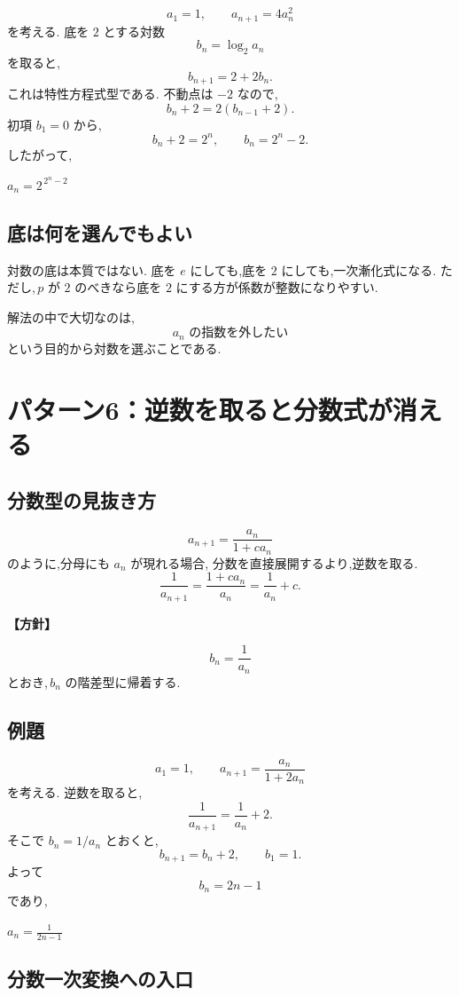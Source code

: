 \[
  a_1=1,\qquad a_{n+1}=4a_n^2
\]
を考える.
底を $2$ とする対数
\[
  b_n=\log_2a_n
\]
を取ると,
\[
  b_{n+1}=2+2b_n.
\]
これは特性方程式型である.
不動点は $-2$ なので,
\[
  b_n+2=2(b_{n-1}+2).
\]
初項 $b_1=0$ から,
\[
  b_n+2=2^n,
\qquad
  b_n=2^n-2.
\]
したがって,
\begin{mdquote}
  $a_n=2^{\,2^n-2}$
\end{mdquote}

\subsection{底は何を選んでもよい}

対数の底は本質ではない.
底を $e$ にしても,底を $2$ にしても,一次漸化式になる.
ただし,\,$p$ が $2$ のべきなら底を $2$ にする方が係数が整数になりやすい.

解法の中で大切なのは,
\[
  a_n\text{ の指数を外したい}
\]
という目的から対数を選ぶことである.

\section{パターン6：逆数を取ると分数式が消える}

\subsection{分数型の見抜き方}

\[
  a_{n+1}=\frac{a_n}{1+ca_n}
\]
のように,分母にも $a_n$ が現れる場合,
分数を直接展開するより,逆数を取る.
\[
  \frac1{a_{n+1}}
  =\frac{1+ca_n}{a_n}
  =\frac1{a_n}+c.
\]

\noindent\textbf{【方針】}

\[
  b_n=\frac1{a_n}
\]
とおき,\,$b_n$ の階差型に帰着する.

\subsection{例題}

\[
  a_1=1,\qquad
  a_{n+1}=\frac{a_n}{1+2a_n}
\]
を考える.
逆数を取ると,
\[
  \frac1{a_{n+1}}
  =\frac1{a_n}+2.
\]
そこで $b_n=1/a_n$ とおくと,
\[
  b_{n+1}=b_n+2,\qquad b_1=1.
\]
よって
\[
  b_n=2n-1
\]
であり,
\begin{mdquote}
  $a_n=\frac1{2n-1}$
\end{mdquote}

\subsection{分数一次変換への入口}

